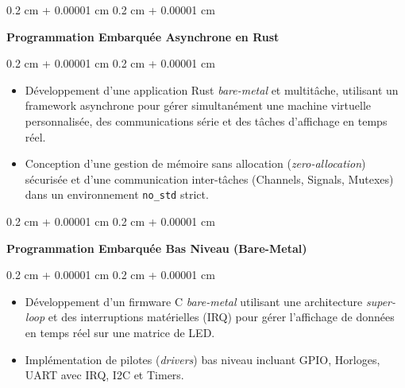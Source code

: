 \documentclass[10pt, a4]{article}
\newenvironment{highlights}{
    \begin{itemize}[
        topsep=0.10 cm,
        parsep=0.10 cm,
        partopsep=0pt,
        itemsep=0pt,
        leftmargin=0.4 cm + 10pt
    ]
}{
    \end{itemize}
} %
\newenvironment{onecolentry}{
    \begin{adjustwidth}{
        0.2 cm + 0.00001 cm
    }{
        0.2 cm + 0.00001 cm
    }
}{
    \end{adjustwidth}
} %
\begin{document}
        \begin{onecolentry}
            \textbf{Programmation Embarquée Asynchrone en Rust}
        \end{onecolentry}
        \vspace{0.05 cm}
        \begin{onecolentry}
            \begin{highlights}
                \item Développement d'une application Rust \textit{bare-metal}
                    et multitâche, utilisant un framework asynchrone pour gérer
                    simultanément une machine virtuelle personnalisée, des
                    communications série et des tâches d'affichage en temps
                    réel.
                \item Conception d'une gestion de mémoire sans allocation
                    (\textit{zero-allocation}) sécurisée et d'une communication
                    inter-tâches (Channels, Signals, Mutexes) dans un
                    environnement \texttt{no\_std} strict.
            \end{highlights}
        \end{onecolentry}
        \vspace{0.2 cm}

        \begin{onecolentry}
            \textbf{Programmation Embarquée Bas Niveau (Bare-Metal)}
        \end{onecolentry}
        \vspace{0.05 cm}
        \begin{onecolentry}
            \begin{highlights}
                \item Développement d'un firmware C \textit{bare-metal}
                    utilisant une architecture \textit{super-loop} et des
                    interruptions matérielles (IRQ) pour gérer l'affichage de
                    données en temps réel sur une matrice de LED.
                \item Implémentation de pilotes (\textit{drivers}) bas niveau
                    incluant GPIO, Horloges, UART avec IRQ, I2C et Timers.
            \end{highlights}
        \end{onecolentry}
        \vspace{0.2 cm}
\end{document}

